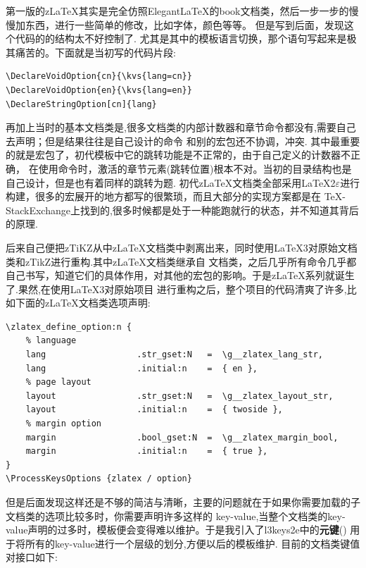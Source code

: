 第一版的z\LaTeX{}其实是完全仿照Elegant\LaTeX{}的book文档类，然后一步一步的慢慢加东西，进行一些简单的修改，比如字体，颜色等等。
但是写到后面，发现这个代码的的结构太不好控制了.
尤其是其中的模板语言切换，那个\cmd{\ifdefstring}语句写起来是极其痛苦的。下面就是当初写的代码片段:

\begin{verbatim}
\DeclareVoidOption{cn}{\kvs{lang=cn}}
\DeclareVoidOption{en}{\kvs{lang=en}}
\DeclareStringOption[cn]{lang}
\end{verbatim}

再加上当时的基本文档类是,很多文档类的内部计数器和章节命令都没有,需要自己去声明；但是结果往往是自己设计的命令
和别的宏包还不协调，冲突. 其中最重要的就是宏包了，初代模板中它的跳转功能是不正常的，由于自己定义的计数器不正确，
在使用\cmd{\label}命令时，激活的章节元素(跳转位置)根本不对。当初的目录结构也是自己设计，但是也有着同样的跳转为题.
初代z\LaTeX{}文档类全部采用\LaTeX{}2$\varepsilon$进行构建，很多的宏展开的地方都写的很繁琐，而且大部分的实现方案都是在
\TeX-StackExchange上找到的,很多时候都是处于一种能跑就行的状态，并不知道其背后的原理. 

后来自己便把zTiKZ从中z\LaTeX{}文档类中剥离出来，同时使用\LaTeX{}3对原始文档类和zTikZ进行重构.其中z\LaTeX{}文档类继承自
文档类，之后几乎所有命令几乎都自己书写，知道它们的具体作用，对其他的宏包的影响。于是z\LaTeX{}系列就诞生了.果然,在使用\LaTeX3对原始项目
进行重构之后，整个项目的代码清爽了许多,比如下面的z\LaTeX{}文档类选项声明:

\begin{verbatim}
\zlatex_define_option:n {
    % language
    lang                  .str_gset:N   =  \g__zlatex_lang_str,
    lang                  .initial:n    =  { en },
    % page layout
    layout                .str_gset:N   =  \g__zlatex_layout_str,
    layout                .initial:n    =  { twoside },
    % margin option
    margin                .bool_gset:N  =  \g__zlatex_margin_bool,
    margin                .initial:n    =  { true },
}
\ProcessKeysOptions {zlatex / option}
\end{verbatim}

但是后面发现这样还是不够的简洁与清晰，主要的问题就在于如果你需要加载的子文档类的选项比较多时，你需要声明许多这样的
key-value,当整个文档类的key-value声明的过多时，模板便会变得难以维护。于是我引入了l3keys2e中的\textbf{元键}()
用于将所有的key-value进行一个层级的划分,方便以后的模板维护. 目前的文档类键值对接口如下:

